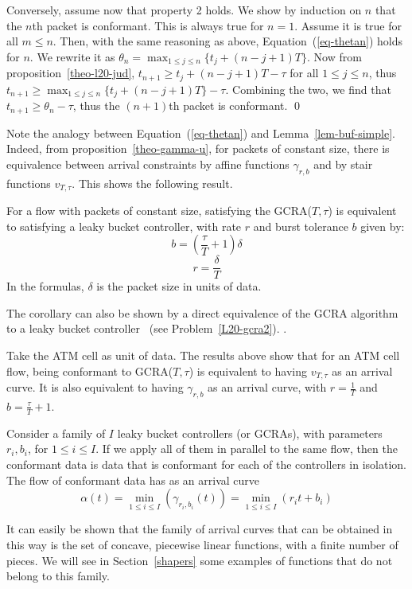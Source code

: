 Conversely, assume now that property 2 holds. We show by induction
on $n$ that the $n$th packet is conformant. This is always true
for $n=1$. Assume it is true for all $m \leq n$. Then, with the
same reasoning as above, Equation~(\ref{eq-thetan}) holds for $n$.
We rewrite it as $\theta_{n}= \max_{1 \leq j \leq n
}\{t_{j}+(n-j+1)T \}$. Now from proposition~\ref{theo-l20-jud},
$t_{n+1} \geq t_{j}+(n-j+1)T - \tau$ for all $1 \leq j \leq n$,
thus $t_{n+1} \geq \max_{1 \leq j \leq n }\{t_{j}+(n-j+1)T \}-
\tau$. Combining the two, we find that $t_{n+1} \geq \theta_{n} -
\tau$, thus the $(n+1)$th packet is conformant. \qed

Note the analogy between Equation~(\ref{eq-thetan}) and
Lemma~\ref{lem-buf-simple}.  Indeed, from
proposition~\ref{theo-gamma-u}, for packets of constant size,
there is equivalence between arrival constraints by affine
functions $\gamma_{r,b}$ and by stair functions $v_{T, \tau}$.
This shows the following result.
\begin{corollary}
    For a flow with packets of constant size, satisfying the
GCRA($T,\tau$) is equivalent to satisfying a leaky bucket
controller, with rate $r$ and burst tolerance $b$ given by:
$$ b = (\frac{\tau}{T} + 1) \delta $$
$$ r = \frac{\delta}{T} $$
In the formulas, $\delta$ is the packet size in units of data.
\end{corollary}
The corollary can also be shown by a direct equivalence of the GCRA
algorithm to a leaky bucket controller%
\ifexos
~(see Problem~\ref{L20-gcra2}).%
\else
.%
\fi

Take the ATM cell as unit of data. The results above show that for
an ATM cell flow, being conformant to GCRA($T, \tau$) is
equivalent to having $v_{T, \tau}$ as an arrival curve. It is also
equivalent to having $\gamma_{r,b}$ as an arrival curve, with
$r=\frac{1}{T}$ and $b=\frac{\tau}{T}+1$.

Consider a family of $I$ leaky bucket controllers (or GCRAs), with
parameters $r_{i}, b_{i}$, for $1 \leq i \leq I$. If we apply all
of them in parallel to the same flow, then the conformant data is
data that is conformant for each of the controllers in isolation.
The flow of conformant data has as an arrival curve
$$\alpha(t) = \min_{1 \leq i \leq I}(\gamma_{r_{i}, b_{i}}(t))=
\min_{1 \leq i \leq I}  (r_{i}t + b_{i})$$

It can easily be shown that the family of arrival curves that can be
obtained in this way is the set of concave, piecewise linear
functions, with a finite number of pieces.  We will see in
Section~\ref{shapers} some examples of functions that do not belong to
this family.

